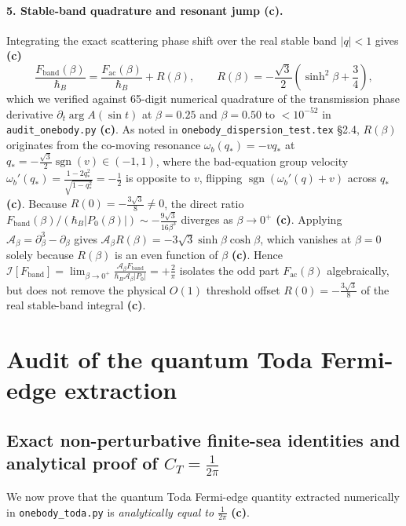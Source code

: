 \documentclass[11pt,a4paper]{article}
\newcommand{\claim}[1]{\textbf{(#1)}}
\begin{document}
\paragraph{5. Stable-band quadrature and resonant jump \claim{c}.}
Integrating the exact scattering phase shift over the real stable band $|q|<1$ gives \claim{c}
\begin{equation}
  \frac{F_{\mathrm{band}}(\beta)}{\hbar_B}
  = \frac{F_{\mathrm{ac}}(\beta)}{\hbar_B} + R(\beta), \qquad
  R(\beta) = -\frac{\sqrt{3}}{2}\left(\sinh^2\beta + \frac{3}{4}\right),
  \label{eq:Fband}
\end{equation}
which we verified against 65-digit numerical quadrature of the transmission phase derivative
$\partial_t\arg A(\sin t)$ at $\beta = 0.25$ and $\beta = 0.50$ to $<10^{-52}$ in \texttt{audit\_onebody.py} \claim{c}.
As noted in \texttt{onebody\_dispersion\_test.tex} §2.4, $R(\beta)$ originates from the co-moving
resonance $\omega_b(q_*) = -v q_*$ at $q_* = -\frac{\sqrt{3}}{2}\operatorname{sgn}(v) \in (-1,1)$,
where the bad-equation group velocity $\omega_b'(q_*) = \frac{1-2q_*^2}{\sqrt{1-q_*^2}} = -\frac{1}{2}$
is opposite to $v$, flipping $\operatorname{sgn}(\omega_b'(q)+v)$ across $q_*$ \claim{c}.
Because $R(0) = -\frac{3\sqrt{3}}{8} \neq 0$, the direct ratio $F_{\mathrm{band}}(\beta)/(\hbar_B|P_0(\beta)|)
\sim -\frac{9\sqrt{3}}{16\beta^3}$ diverges as $\beta\to 0^+$ \claim{c}.
Applying $\mathcal{A}_\beta = \partial_\beta^3 - \partial_\beta$ gives
$\mathcal{A}_\beta R(\beta) = -3\sqrt{3}\sinh\beta\cosh\beta$, which vanishes at $\beta=0$
solely because $R(\beta)$ is an even function of $\beta$ \claim{c}. Hence
$\mathcal{I}[F_{\mathrm{band}}] = \lim_{\beta\to 0^+}\frac{\mathcal{A}_\beta F_{\mathrm{band}}}{\hbar_B\mathcal{A}_\beta|P_0|} = +\frac{2}{\pi}$
isolates the odd part $F_{\mathrm{ac}}(\beta)$ algebraically, but does not remove the physical $O(1)$
threshold offset $R(0) = -\frac{3\sqrt{3}}{8}$ of the real stable-band integral \claim{c}.

\section{Audit of the quantum Toda Fermi-edge extraction}

\subsection{Exact non-perturbative finite-sea identities and analytical proof of $C_T = \frac{1}{2\pi}$}

We now prove that the quantum Toda Fermi-edge quantity extracted numerically in \texttt{onebody\_toda.py}
is \emph{analytically equal to $\frac{1}{2\pi}$} \claim{c}.
\end{document}
